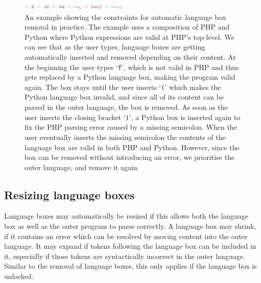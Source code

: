 \documentclass[sigplan,screen]{acmart}\settopmatter{printfolios=true,printccs=false,printacmref=false}
\newcommand{\qtt}[1]{`\texttt{#1}'\xspace}
\begin{document}
\begin{figure}
\begin{center}
\vspace{0.8em}
\includegraphics[width=0.45\textwidth]{images/autoremove_foo.png}
\vspace{-0.8em}
\end{center}
\caption{An example showing the constraints for automatic language box removal in practice.
The example uses a composition of PHP and Python where Python expressions are valid at
PHP's top-level.
We can see that as the user types, language boxes are getting automatically
inserted and removed depending on their content. At the beginning the user types
\qtt{f}, which is not valid in PHP and thus gets replaced by a Python
language box, making the program valid again. The box stays until the user
inserts \qtt{(} which makes the Python language box invalid, and since all of
its content can be parsed in the outer language, the box is removed.
As soon as the user inserts the closing bracket \qtt{)}, a Python box is
inserted again to fix the PHP parsing error caused by a missing semicolon. When the
user eventually inserts the missing semicolon the contents of the language box
are valid in both PHP and Python. However, since the box can be removed
without introducing an error, we prioritise the outer
language, and remove it again.}
\label{fig_autoremoval}
\end{figure}


\subsection{Resizing language boxes}

Language boxes may automatically be resized if this allows both the language box as
well as the outer program to parse correctly. A language box may shrink, if it
contains an error which can be resolved by moving content into the outer
language. It may expand if tokens following the language box can be included in it,
especially if those tokens are syntactically incorrect in the outer language.
Similar to the removal of language boxes, this only applies if the language box
is unlocked.
\end{document}
